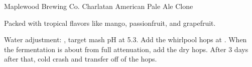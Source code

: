 \begin{recipe}{Maplewood Brewing Co. Charlatan American Pale Ale Clone}

\begin{aboutblock}
Packed with tropical flavors like mango, passionfruit, and grapefruit. \sourceaha
\end{aboutblock}


\begin{methodandtiming}
 
\begin{mashsteps}
\end{mashsteps}

\begin{directions}
Water adjustment: , target mash pH at
5.3. Add the whirlpool hops at . When the fermentation is about
 from full attenuation, add the dry hops. After 3 days after that,
cold crash and transfer off of the hops.
\end{directions}

\end{methodandtiming}

\recipebreak

\begin{ingredientsblock}

\begin{malts}
\end{malts}

\begin{hops}
\end{hops}


\end{ingredientsblock}

\end{recipe}
